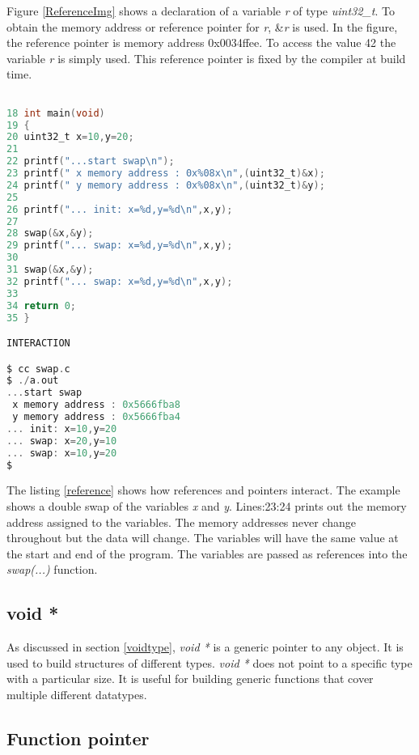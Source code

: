 Figure \ref{ReferenceImg} shows a declaration of a variable \textit{r} of type \textit{uint32\_t}. To obtain the memory address or reference pointer for \textit{r}, \&\textit{r} is used. In the figure, the reference pointer is memory address 0x0034ffee. To access the value 42 the variable \textit{r} is simply used. This reference pointer is fixed by the compiler at build time. 
   
\begin{lstlisting}[language=C,showstringspaces=false,caption={File: swap.c, part 2},captionpos=b,label=reference]

18 int main(void)
19 {
20 uint32_t x=10,y=20;
21 
22 printf("...start swap\n");
23 printf(" x memory address : 0x%08x\n",(uint32_t)&x);
24 printf(" y memory address : 0x%08x\n",(uint32_t)&y);
25 
26 printf("... init: x=%d,y=%d\n",x,y);
27 
28 swap(&x,&y);
29 printf("... swap: x=%d,y=%d\n",x,y);
30 
31 swap(&x,&y);
32 printf("... swap: x=%d,y=%d\n",x,y);
33 
34 return 0;
35 }

INTERACTION

$ cc swap.c
$ ./a.out
...start swap
 x memory address : 0x5666fba8
 y memory address : 0x5666fba4
... init: x=10,y=20
... swap: x=20,y=10
... swap: x=10,y=20
$
\end{lstlisting}

The listing \ref{reference} shows how references and pointers interact. The example shows a double swap of the variables \textit{x} and \textit{y}. Lines:23:24 prints out the memory address assigned to the variables. The memory addresses never change throughout but the data will change. The variables will have the same value at the start and end of the program. The variables are passed as references into the \textit{swap(...)} function. 

\subsection{void *}


As discussed in section \ref{voidtype}, \textit{void *} is a generic pointer to any object. It is used to build structures of different types. \textit{void *} does not point to a specific type with a particular size. It is useful for building generic functions that cover multiple different datatypes. 

\subsection{Function pointer}

